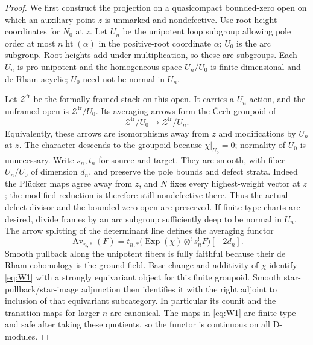 \begin{proof}
We first construct the projection on a quasicompact bounded-zero open on
which an auxiliary point $z$ is unmarked and nondefective. Use root-height
coordinates for $N_0$ at $z$. Let $U_n$ be the unipotent loop subgroup
allowing pole order at most $n\operatorname{ht}(\alpha)$ in the
positive-root coordinate $\alpha$; $U_0$ is the arc subgroup. Root heights
add under multiplication, so these are subgroups. Each $U_n$ is
pro-unipotent and the homogeneous space $U_n/U_0$ is finite dimensional
and de Rham acyclic; $U_0$ need not be normal in $U_n$.

Let $\mathcal Z^{\mathrm{fr}}$ be the formally framed stack on this
open. It carries a $U_n$-action, and the unframed open is
$\mathcal Z^{\mathrm{fr}}/U_0$. Its averaging arrows form the \v Cech
groupoid of
\[
 \mathcal Z^{\mathrm{fr}}/U_0
   \longrightarrow\mathcal Z^{\mathrm{fr}}/U_n.
\]
Equivalently, these arrows are isomorphisms away from $z$ and
modifications by $U_n$ at $z$. The character descends to the groupoid
because $\chi|_{U_0}=0$; normality of $U_0$ is unnecessary. Write
$s_n,t_n$ for source and target. They are smooth, with
fiber $U_n/U_0$ of dimension $d_n$, and preserve the pole bounds and defect
strata. Indeed the Pl\"ucker maps agree away from $z$, and $N$ fixes
every highest-weight vector at $z$; the modified reduction is therefore
still nondefective there. Thus the actual defect divisor and the
bounded-zero open are preserved. If finite-type charts are desired, divide frames by an arc subgroup
sufficiently deep to be normal in $U_n$. The arrow splitting of the
determinant line defines the averaging functor
\begin{equation}\label{eq:W1}
 \operatorname{Av}_{n,*}(F)=
 t_{n,*}\bigl(\operatorname{Exp}(\chi)\otimes^!s_n^!F\bigr)[-2d_n].
\end{equation}
Smooth pullback along the unipotent fibers is fully faithful because
their de Rham cohomology is the ground field. Base change and additivity of
$\chi$ identify \eqref{eq:W1} with a strongly equivariant object for this
finite groupoid. Smooth star-pullback/star-image adjunction then identifies
it with the right adjoint to inclusion of that equivariant subcategory.
In particular its counit and the transition maps for larger $n$ are
canonical. The maps in \eqref{eq:W1} are finite-type and safe after taking
these quotients, so the functor is continuous on all D-modules.


\end{proof}
